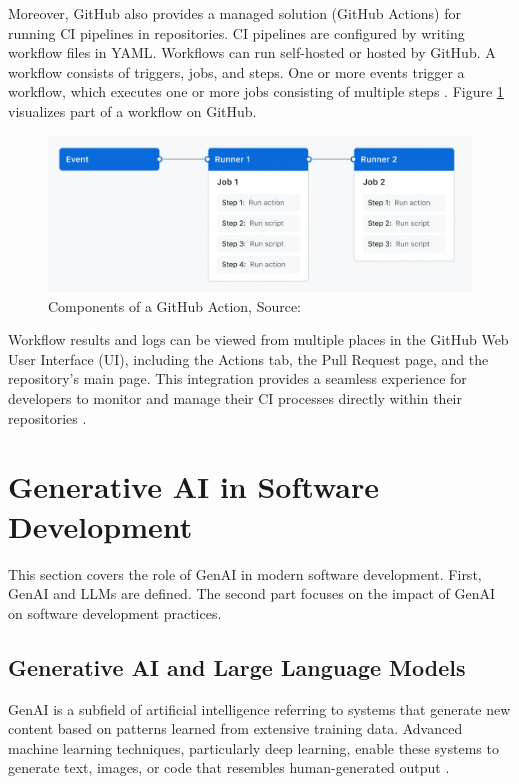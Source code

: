 Moreover, GitHub also provides a managed solution (GitHub Actions) for running CI pipelines in repositories. CI pipelines are configured by writing workflow files in YAML. Workflows can run self-hosted or hosted by GitHub. A workflow consists of triggers, jobs, and steps. One or more events trigger a workflow, which executes one or more jobs consisting of multiple steps \cite{UnderstandingGitHubActionsa}. Figure \ref{fig:gh-workflow} visualizes part of a workflow on GitHub.

\begin{figure}[H]
    \centering
    \includegraphics[width=1\textwidth]{images/overview-actions-simple.png}
    \caption{Components of a GitHub Action, Source:~\cite{UnderstandingGitHubActionsa}}
    \label{fig:gh-workflow}
\end{figure}

Workflow results and logs can be viewed from multiple places in the GitHub Web User Interface (UI), including the Actions tab, the Pull Request page, and the repository's main page. This integration provides a seamless experience for developers to monitor and manage their CI processes directly within their repositories \cite{GitHubActions2025}.


\section{Generative AI in Software Development}

This section covers the role of \ac{GenAI} in modern software development. First, \ac{GenAI} and \acp{LLM} are defined. The second part focuses on the impact of \ac{GenAI} on software development practices.

\subsection{Generative AI and Large Language Models}
\ac{GenAI} is a subfield of artificial intelligence referring to systems that generate new content based on patterns learned from extensive training data. Advanced machine learning techniques, particularly deep learning, enable these systems to generate text, images, or code that resembles human-generated output \cite{WhatGenerativeAI2021}.

